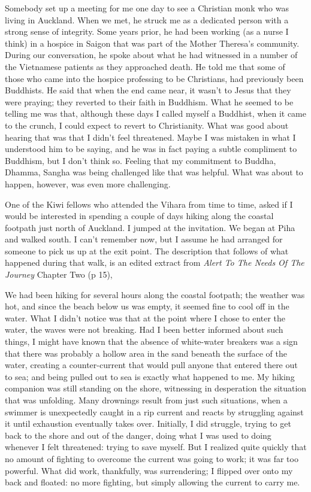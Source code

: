 Somebody set up a meeting for me one day to see a Christian monk who was
living in Auckland. When we met, he struck me as a dedicated person with
a strong sense of integrity. Some years prior, he had been working (as a
nurse I think) in a hospice in Saigon that was part of the Mother
Theresa's community. During our conversation, he spoke about what he had
witnessed in a number of the Vietnamese patients as they approached
death. He told me that some of those who came into the hospice
professing to be Christians, had previously been Buddhists. He said that
when the end came near, it wasn't to Jesus that they were praying; they
reverted to their faith in Buddhism. What he seemed to be telling me was
that, although these days I called myself a Buddhist, when it came to
the crunch, I could expect to revert to Christianity. What was good
about hearing that was that I didn't feel threatened. Maybe I was
mistaken in what I understood him to be saying, and he was in fact
paying a subtle compliment to Buddhism, but I don't think so. Feeling
that my commitment to Buddha, Dhamma, Sangha was being challenged like
that was helpful. What was about to happen, however, was even more
challenging.

One of the Kiwi fellows who attended the Vihara from time to time, asked
if I would be interested in spending a couple of days hiking along the
coastal footpath just north of Auckland. I jumped at the invitation. We
began at Piha\cite{piha} and walked south. I can't remember now, but I assume he had
arranged for someone to pick us up at the exit point. The description
that follows of what happened during that walk, is an edited extract
from \emph{Alert To The Needs Of The Journey}\cite{alert} Chapter Two (p 15),

We had been hiking for several hours along the coastal footpath; the
weather was hot, and since the beach below us was empty, it seemed fine
to cool off in the water. What I didn't notice was that at the point
where I chose to enter the water, the waves were not breaking. Had I
been better informed about such things, I might have known that the
absence of white-water breakers was a sign that there was probably a
hollow area in the sand beneath the surface of the water, creating a
counter-current that would pull anyone that entered there out to sea;
and being pulled out to sea is exactly what happened to me. My hiking
companion was still standing on the shore, witnessing in desperation the
situation that was unfolding. Many drownings result from just such
situations, when a swimmer is unexpectedly caught in a rip current and
reacts by struggling against it until exhaustion eventually takes over.
Initially, I did struggle, trying to get back to the shore and out of
the danger, doing what I was used to doing whenever I felt threatened:
trying to save myself. But I realized quite quickly that no amount of
fighting to overcome the current was going to work; it was far too
powerful. What did work, thankfully, was surrendering; I flipped over
onto my back and floated: no more fighting, but simply allowing the
current to carry me.

